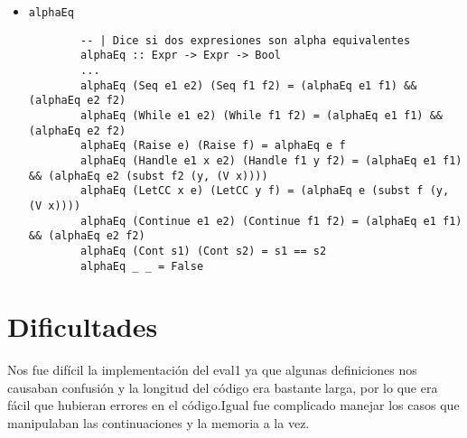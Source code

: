 \documentclass{article}
\newcommand{\tx}[1]{\texttt{#1}}
\begin{document}
\begin{itemize}
        \item \tx{alphaEq}
        \begin{verbatim}
        -- | Dice si dos expresiones son alpha equivalentes
        alphaEq :: Expr -> Expr -> Bool
        ...
        alphaEq (Seq e1 e2) (Seq f1 f2) = (alphaEq e1 f1) && (alphaEq e2 f2)
        alphaEq (While e1 e2) (While f1 f2) = (alphaEq e1 f1) && (alphaEq e2 f2)
        alphaEq (Raise e) (Raise f) = alphaEq e f
        alphaEq (Handle e1 x e2) (Handle f1 y f2) = (alphaEq e1 f1) && (alphaEq e2 (subst f2 (y, (V x))))
        alphaEq (LetCC x e) (LetCC y f) = (alphaEq e (subst f (y, (V x))))
        alphaEq (Continue e1 e2) (Continue f1 f2) = (alphaEq e1 f1) && (alphaEq e2 f2)
        alphaEq (Cont s1) (Cont s2) = s1 == s2
        alphaEq _ _ = False
        \end{verbatim}
    \end{itemize}

    \section*{Dificultades}
    Nos fue difícil la implementación del eval1 ya que algunas definiciones nos 
    causaban confusión y la longitud del código era bastante larga, por lo que 
    era fácil que hubieran errores en el código.Igual fue complicado manejar los
    casos que manipulaban las continuaciones y la memoria a la vez.
    
\end{document}
